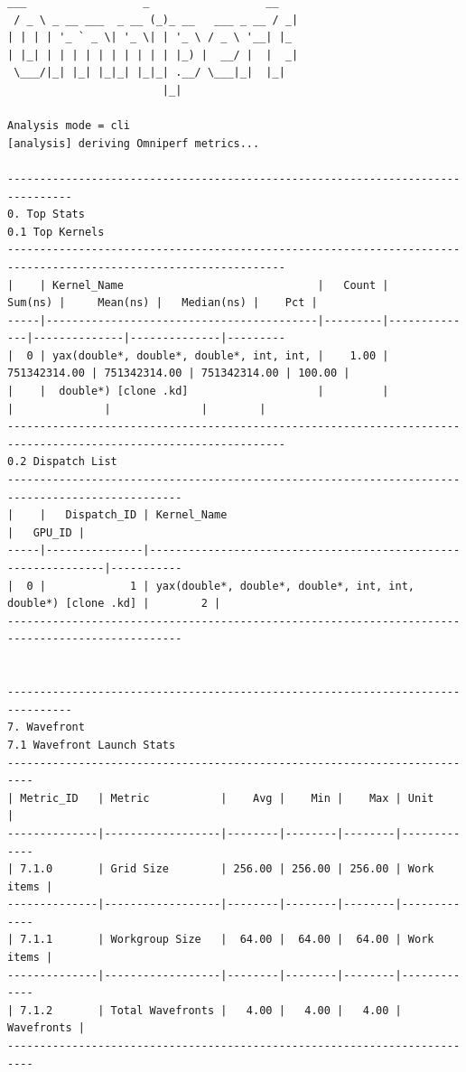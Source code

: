 \documentclass[
]{article}
\begin{document}
\begin{Verbatim}[fontsize=\footnotesize] 
  ___                  _                  __
 / _ \ _ __ ___  _ __ (_)_ __   ___ _ __ / _|
| | | | '_ ` _ \| '_ \| | '_ \ / _ \ '__| |_
| |_| | | | | | | | | | | |_) |  __/ |  |  _|
 \___/|_| |_| |_|_| |_|_| .__/ \___|_|  |_|
                        |_|

Analysis mode = cli
[analysis] deriving Omniperf metrics...
                                                                                                                                                                                                                --------------------------------------------------------------------------------
0. Top Stats
0.1 Top Kernels
-----------------------------------------------------------------------------------------------------------------
|    | Kernel_Name                              |   Count |      Sum(ns) |     Mean(ns) |   Median(ns) |    Pct |
-----|------------------------------------------|---------|--------------|--------------|--------------|---------
|  0 | yax(double*, double*, double*, int, int, |    1.00 | 751342314.00 | 751342314.00 | 751342314.00 | 100.00 |
|    |  double*) [clone .kd]                    |         |              |              |              |        |
-----------------------------------------------------------------------------------------------------------------                                                                                               0.2 Dispatch List
-------------------------------------------------------------------------------------------------
|    |   Dispatch_ID | Kernel_Name                                                   |   GPU_ID |
-----|---------------|---------------------------------------------------------------|-----------
|  0 |             1 | yax(double*, double*, double*, int, int, double*) [clone .kd] |        2 |
-------------------------------------------------------------------------------------------------

                                                                                                                                                                                                                --------------------------------------------------------------------------------
7. Wavefront
7.1 Wavefront Launch Stats
--------------------------------------------------------------------------
| Metric_ID   | Metric           |    Avg |    Min |    Max | Unit       |
--------------|------------------|--------|--------|--------|-------------
| 7.1.0       | Grid Size        | 256.00 | 256.00 | 256.00 | Work items |
--------------|------------------|--------|--------|--------|-------------
| 7.1.1       | Workgroup Size   |  64.00 |  64.00 |  64.00 | Work items |
--------------|------------------|--------|--------|--------|-------------
| 7.1.2       | Total Wavefronts |   4.00 |   4.00 |   4.00 | Wavefronts |
--------------------------------------------------------------------------
\end{Verbatim}
\end{document}
